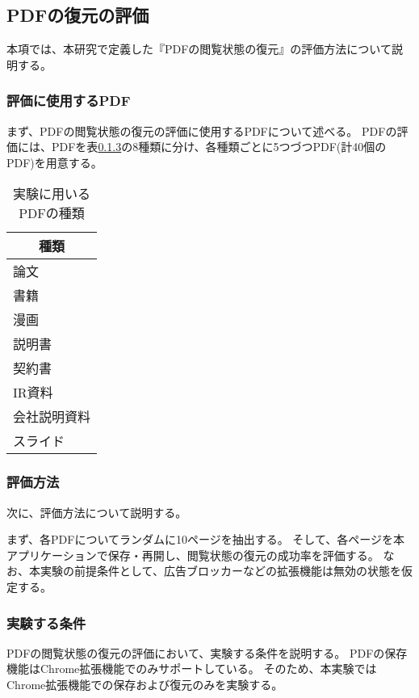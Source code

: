 \subsection{PDFの復元の評価}
本項では、本研究で定義した『PDFの閲覧状態の復元』の評価方法について説明する。


\subsubsection{評価に使用するPDF}
まず、PDFの閲覧状態の復元の評価に使用するPDFについて述べる。
PDFの評価には、PDFを表\ref{}の8種類に分け、各種類ごとに5つづつPDF(計40個のPDF)を用意する。

\begin{table}[htbp]
  \label{tb:evl-pdf-list}
  \caption{実験に用いるPDFの種類}
  \begin{center}
    \begin{tabular}{|l|}
    \hline
    \multicolumn{1}{|c|}{\textbf{種類}} \\\hline
    論文 \\ \hline
    書籍 \\ \hline
    漫画 \\ \hline
    説明書 \\ \hline
    契約書 \\ \hline
    IR資料 \\ \hline
    会社説明資料 \\ \hline
    スライド \\ \hline
    \end{tabular}
  \end{center}
\end{table}

\subsubsection{評価方法}
次に、評価方法について説明する。

まず、各PDFについてランダムに10ページを抽出する。
そして、各ページを本アプリケーションで保存・再開し、閲覧状態の復元の成功率を評価する。
なお、本実験の前提条件として、広告ブロッカーなどの拡張機能は無効の状態を仮定する。

\subsubsection{実験する条件}
PDFの閲覧状態の復元の評価において、実験する条件を説明する。
PDFの保存機能はChrome拡張機能でのみサポートしている。
そのため、本実験ではChrome拡張機能での保存および復元のみを実験する。
